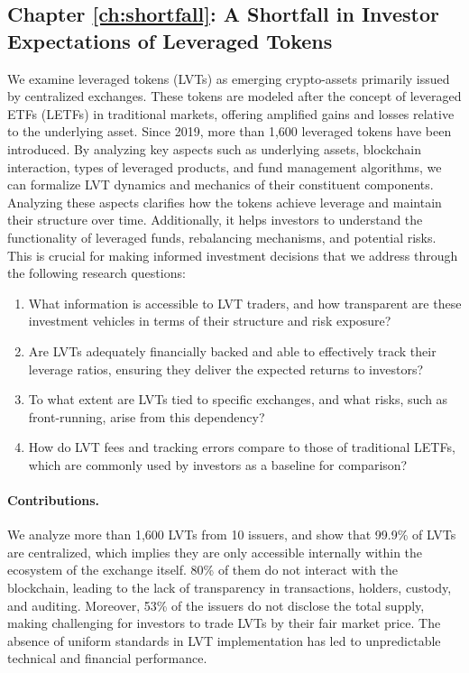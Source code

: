 \subsection{Chapter \ref{ch:shortfall}: A Shortfall in Investor Expectations of Leveraged Tokens}
We examine leveraged tokens (LVTs) as emerging crypto-assets primarily issued by centralized exchanges. These tokens are modeled after the concept of leveraged ETFs (LETFs) in traditional markets, offering amplified gains and losses relative to the underlying asset. Since 2019, more than 1,600 leveraged tokens have been introduced. By analyzing key aspects such as underlying assets, blockchain interaction, types of leveraged products, and fund management algorithms, we can formalize LVT dynamics and mechanics of their constituent components. Analyzing these aspects clarifies how the tokens achieve leverage and maintain their structure over time. Additionally, it helps investors to understand the functionality of leveraged funds, rebalancing mechanisms, and potential risks. This is crucial for making informed investment decisions that we address through the following research questions:
\begin{enumerate}[label={(RQ5.\arabic*)},leftmargin=*]
	\item What information is accessible to LVT traders, and how transparent are these investment vehicles in terms of their structure and risk exposure?
	\item  Are LVTs adequately financially backed and able to effectively track their leverage ratios, ensuring they deliver the expected returns to investors?
	\item To what extent are LVTs tied to specific exchanges, and what risks, such as front-running, arise from this dependency?
	\item How do LVT fees and tracking errors compare to those of traditional LETFs, which are commonly used by investors as a baseline for comparison?
\end{enumerate}
\paragraph{Contributions.} We analyze more than 1,600 LVTs from 10 issuers, and show that 99.9\% of LVTs are centralized, which implies they are only accessible internally within the ecosystem of the exchange itself. 80\% of them do not interact with the blockchain, leading to the lack of transparency in transactions, holders, custody, and auditing. Moreover, 53\% of the issuers do not disclose the total supply, making challenging for investors to trade LVTs by their fair market price. The absence of uniform standards in LVT implementation has led to unpredictable technical and financial performance. 

